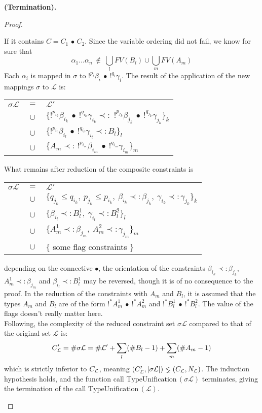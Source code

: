 \begin{thm}{\bf (Termination).}
\begin{proof}
\begin{itemize}
				If it contains $C = C_1 \,\bullet\, C_2$. Since the variable ordering did not fail, we know for sure that
						$$\alpha_1 \dots \alpha_n ~ \notin ~ \bigcup_{l} FV(B_l) \cup \bigcup_{m} FV(A_m)$$
				Each $\alpha_i$ is mapped in $\sigma$ to $!^{p_i} \beta_i ~ \bullet ~ !^{q_i}\gamma_i$.
				The result of the application of the new mappings $\sigma$ to $\mathcal{L}$ is:
			  	\begin{center}
			  	\begin{tabular}{lcl}
			  		$\sigma \mathcal{L}$ & $ = $ & $\mathcal{L'}$ \\
				  	& $ \cup $ & $\{!^{p_{i_k}} \beta_{i_k} ~ \bullet ~ !^{q_{i_k}}\gamma_{i_k} \prec: \,
				  	              \,!^{p_{j_k}} \beta_{j_k} ~ \bullet ~ !^{q_{j_k}}\gamma_{j_k} \}_k$ \\
				  	& $ \cup $ & $\{!^{p_{i_l}} \beta_{i_l} ~ \bullet ~ !^{q_{i_l}}\gamma_{i_l} \prec: B_l \}_l$ \\
				  	& $ \cup $ & $\{ A_m \prec: \,!^{p_{i_m}} \beta_{i_m} ~ \bullet ~ !^{q_{i_m}}\gamma_{i_m} \}_m$
				  \end{tabular}
				  \end{center}
       	What remains after reduction of the composite constraints is
					\begin{center}
			  	\begin{tabular}{lcl}
			  		$\sigma \mathcal{L}$ & $ = $ & $\mathcal{L'}$ \\
			  		& $ \cup $ & $\{q_{j_k} \le q_{i_k}, ~p_{j_k} \le p_{i_k}, ~\beta_{i_k} \prec: \beta_{j_k}, ~\gamma_{i_k} \prec: \gamma_{j_k} \}_k$ \\
			  		& $ \cup $ & $\{ \beta_{i_l} \prec: B^1_l, ~ \gamma_{i_l} \prec: B^2_l \}_l$ \\
			  		& $ \cup $ & $\{ A^1_m \prec: \beta_{j_m}, ~ A^2_m \prec: \gamma_{j_m} \}_m$ \\
			  		& $ \cup $ & $\{$ some flag constraints $\}$
			  	\end{tabular}
			  	\end{center}
				depending on the connective $\bullet$, the orientation of the constraints $\beta_{i_k} \prec: \beta_{j_k}$,
				$A^1_m \prec: \beta_{j_m}$ and $\beta_{i_l} \prec: B^1_l$ may be reversed, though it is of no consequence to the proof.
			  In the reduction of the constraints with $A_m$ and $B_l$, it is assumed that the types $A_m$ and $B_l$ are of the form
			  $!^*A^1_m ~\bullet~ !^*A^2_m$ and $!^*B^1_l ~\bullet~ !^*B^2_l$. The value of the flags doesn't really matter here. \\
			  Following, the complexity of the reduced constraint set $\sigma \mathcal{L}$ compared to that of the original set $\mathcal{L}$ is:
			  	$$C_{\mathcal{L}}' = \#\sigma\mathcal{L} = \#\mathcal{L'} + \sum_{l} (\#B_l - 1) + \sum_{m} (\#A_m - 1) $$
			  which is strictly inferior to $C_{\mathcal{L}}$, meaning $(C_{\mathcal{L}}',|\sigma\mathcal{L}|) \lneq (C_{\mathcal{L}}, N_{\mathcal{L}})$.
			  The induction hypothesis holds, and the function call $\text{TypeUnification}\,(\sigma \mathcal{L})$ terminates,
			  giving the termination of the call $\text{TypeUnification}\,(\mathcal{L})$.
			  

\end{itemize}
\end{proof}
\end{thm}
